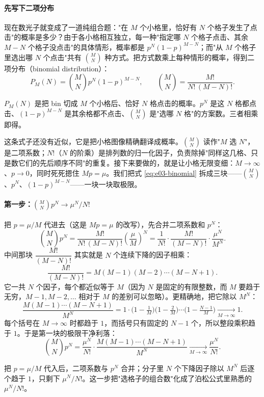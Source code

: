 \paragraph{先写下二项分布}

现在数光子就变成了一道纯组合题："在 $M$ 个小格里，恰好有 $N$ 个格子发生了点击"的概率是多少？由于各小格相互独立，每一种"指定哪 $N$ 个格子点击、其余 $M-N$ 个格子没点击"的具体情形，概率都是 $p^{N}(1-p)^{M-N}$；而"从 $M$ 个格子里选出哪 $N$ 个点击"共有 $\binom{M}{N}$ 种方式。把方式数乘上每种情形的概率，得到二项分布（binomial distribution）：
\begin{equation}
  P_M(N)=\binom{M}{N}p^{N}(1-p)^{M-N},
  \qquad \binom{M}{N}=\frac{M!}{N!\,(M-N)!}.
  \label{eq:e03-binomial}
\end{equation}
\begin{formulaexplain}
$P_M(N)$ 是把 bin 切成 $M$ 个小格后、恰好 $N$ 格点击的概率。$p^{N}$ 是这 $N$ 格都点击、$(1-p)^{M-N}$ 是其余格都不点击、$\binom{M}{N}$ 是"选哪 $N$ 格"的方案数。三者相乘即得。
\end{formulaexplain}
这条式子还没有近似，它是把小格图像精确翻译成概率。$\binom{M}{N}$ 读作"$M$ 选 $N$"，是二项系数；$N!$（$N$ 的阶乘）是排列数的归一化因子，负责除掉"同样这几格、只是数它们的先后顺序不同"的重复。接下来要做的，就是让小格无限变细：$M\to\infty$、$p\to0$，同时死死摁住 $Mp=\mu$。我们把式 \eqref{eq:e03-binomial} 拆成三块——$\binom{M}{N}$、$p^N$、$(1-p)^{M-N}$——一块一块取极限。

\paragraph{\texorpdfstring{第一步：$\binom{M}{N}p^{N}\to \mu^{N}/N!$}{第一步：二项系数那一项的极限}}

把 $p=\mu/M$ 代进去（这是 $Mp=\mu$ 的改写），先合并二项系数和 $p^N$：
\[
  \binom{M}{N}p^{N}
  =\frac{M!}{N!\,(M-N)!}\left(\frac{\mu}{M}\right)^{N}
  =\frac{1}{N!}\cdot\frac{M!}{(M-N)!}\cdot\frac{\mu^{N}}{M^{N}} .
\]
中间那块 $\dfrac{M!}{(M-N)!}$ 其实就是 $N$ 个连续下降的因子相乘：
\[
  \frac{M!}{(M-N)!}=M(M-1)(M-2)\cdots(M-N+1) .
\]
它一共 $N$ 个因子，每个都近似等于 $M$（因为 $N$ 是固定的有限整数，而 $M$ 要趋于无穷，$M-1,M-2,\dots$ 相对于 $M$ 的差别可以忽略）。更精确地，把它除以 $M^{N}$：
\[
  \frac{M(M-1)\cdots(M-N+1)}{M^{N}}
  =1\cdot\Big(1-\tfrac{1}{M}\Big)\Big(1-\tfrac{2}{M}\Big)\cdots\Big(1-\tfrac{N-1}{M}\Big)
  \xrightarrow[M\to\infty]{}1 .
\]
每个括号在 $M\to\infty$ 时都趋于 $1$，而括号只有固定的 $N-1$ 个，所以整段乘积趋于 $1$。于是第一块的极限干净利落：
\begin{equation}
  \binom{M}{N}p^{N}
  =\frac{\mu^{N}}{N!}\cdot\frac{M(M-1)\cdots(M-N+1)}{M^{N}}
  \xrightarrow[M\to\infty]{}\frac{\mu^{N}}{N!}.
  \label{eq:e03-limit-first}
\end{equation}
\begin{formulaexplain}
把 $p=\mu/M$ 代入后，二项系数与 $p^N$ 合并；分子里 $N$ 个下降因子除以 $M^N$ 后逐个趋于 $1$，只剩下 $\mu^N/N!$。这一步把"选格子的组合数"化成了泊松公式里熟悉的 $\mu^N/N!$。
\end{formulaexplain}

